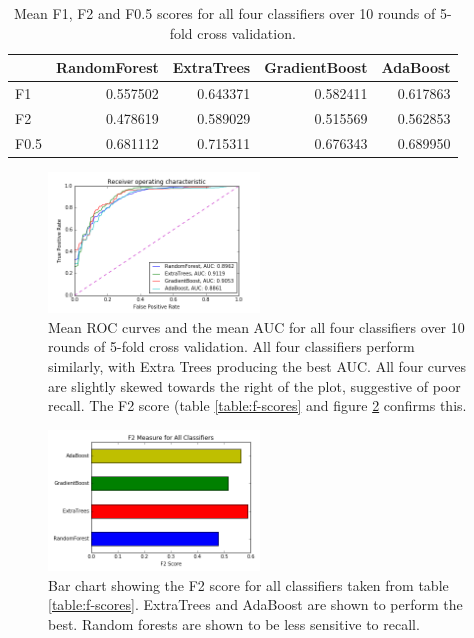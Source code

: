 \documentclass[journal]{IEEEtran}
\begin{document}
\begin{table}
\caption{Mean F1, F2 and F0.5 scores for all four classifiers over 10 rounds of 5-fold cross validation.}
\label{table:f-scores}
\begin{tabular}{lrrrr}
{} &  RandomForest &  ExtraTrees &  GradientBoost &  AdaBoost \\ 
\hline
F1   &      0.557502 &    0.643371 &       0.582411 &  0.617863 \\
F2   &      0.478619 &    0.589029 &       0.515569 &  0.562853 \\
F0.5 &      0.681112 &    0.715311 &       0.676343 &  0.689950 \\
\end{tabular}
\label{table:f-score-smote}
\end{table}

\begin{figure}[!t]
\centering
\includegraphics[width=0.5\textwidth]{../src/img/roc_cv.png}
\caption{Mean ROC curves and the mean AUC for all four classifiers over 10 rounds of 5-fold cross validation. All four classifiers perform similarly, with Extra Trees producing the best AUC. All four curves are slightly skewed towards the right of the plot, suggestive of poor recall. The F2 score (table \ref{table:f-scores} and figure \ref{fig:f2-score} confirms this.}
\label{fig:roc-cv}
\end{figure}

\begin{figure}[!t]
\centering
\includegraphics[width=0.5\textwidth]{../src/img/f2_score.png}
\caption{Bar chart showing the F2 score for all classifiers taken from table \ref{table:f-scores}. ExtraTrees and AdaBoost are shown to perform the best. Random forests are shown to be less sensitive to recall.}
\label{fig:f2-score}
\end{figure}
\end{document}
